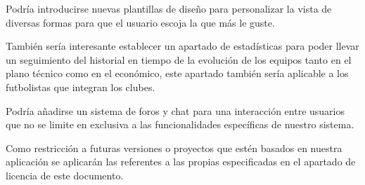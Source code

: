 Podría introducirse nuevas plantillas de diseño para personalizar la vista de
diversas formas para que el usuario escoja la que más le guste.

También sería interesante establecer un apartado de estadísticas para poder
llevar un seguimiento del historial en tiempo de la evolución de los equipos
tanto en el plano técnico como en el económico, este apartado también sería
aplicable a los futbolistas que integran los clubes.

Podría añadirse un sistema de foros y chat para una interacción entre usuarios
que no se limite en exclusiva a las funcionalidades específicas de nuestro
sistema.

Como restricción a futuras versiones o proyectos que estén basados en nuestra
aplicación se aplicarán las referentes a las propias especificadas en el
apartado de licencia de este documento.

